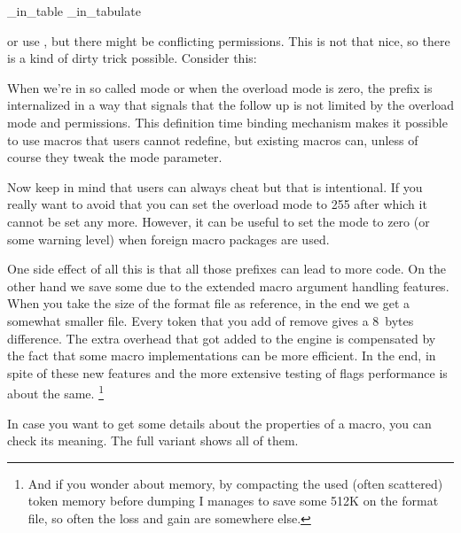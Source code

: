 \starttyping[option=TEX]
\frozen\protected{}
\frozen\protected{}
\overloaded\frozen\let\NC\NC_in_table
\overloaded\frozen\let\NC\NC_in_tabulate
\stoptyping

or use \type {\aliased}, but there might be conflicting permissions. This is not
that nice, so there is a kind of dirty trick possible. Consider this:

\starttyping[option=TEX]
\frozen\protected{}
\frozen\protected{}
\def\setNCintable   {\enforced\let\frozen\let\NC\NC_in_table}
\def\setNCintabulate{\enforced\let\frozen\let\NC\NC_in_tabulate}
\stoptyping

When we're in so called  mode or when the overload mode is zero,
the \type {\enforced} prefix is internalized in a way that signals that the
follow up is not limited by the overload mode and permissions. This definition
time binding mechanism makes it possible to use  macros that
users cannot redefine, but existing macros can, unless of course they tweak the
mode parameter.

Now keep in mind that users can always cheat but that is intentional. If you
really want to avoid that you can set the overload mode to 255 after which it
cannot be set any more. However, it can be useful to set the mode to zero (or
some warning level) when foreign macro packages are used.

\stopsection

\startsection[title=Complications]

One side effect of all this is that all those prefixes can lead to more code. On
the other hand we save some due to the extended macro argument handling features.
When you take the size of the format file as reference, in the end we get a
somewhat smaller file. Every token that you add of remove gives a 8~bytes
difference. The extra overhead that got added to the engine is compensated by the
fact that some macro implementations can be more efficient. In the end, in spite
of these new features and the more extensive testing of flags performance is
about the same. \footnote {And if you wonder about memory, by compacting the used
(often scattered) token memory before dumping I manages to save some 512K on the
format file, so often the loss and gain are somewhere else.}

\stopsection

\startsection[title=Introspection]

In case you want to get some details about the properties of a macro, you can
check its meaning. The full variant shows all of them.

